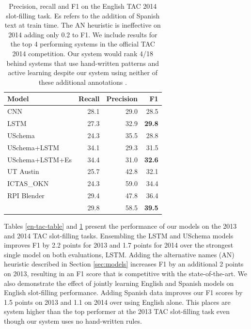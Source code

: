 \begin{table}[t!]
\begin{center}
\begin{tabular}{|lrrr|}
\hline
\bf Model & \bf Recall & \bf Precision & \bf F1 \\
\hline\hline
CNN                 & 28.1 & 29.0 & 28.5 \\
LSTM                & 27.3 & 32.9 & \bf 29.8  \\
USchema             & 24.3 & 35.5 & 28.8 \\
\hline\hline
USchema+LSTM        & 34.1 & 29.3 & 31.5 \\
USchema+LSTM+Es        & 34.4 & 31.0 & \bf 32.6 \\
\hline\hline
UT Austin & 25.7 & 42.8 & 32.1 \\
ICTAS\_OKN & 24.3 & 59.0 & 34.4 \\
RPI Blender & 29.4 & 47.8 & 36.4 \\
\citet{angeli2014stanford} & 29.8 & 58.5 & \bf 39.5 \\

\hline
\end{tabular}
\caption{Precision, recall and F1 on the English TAC 2014 slot-filling task. Es refers to the addition of Spanish text at train time. The AN heuristic is ineffective on 2014 adding only 0.2 to F1. We include results for the top 4 performing systems in the official TAC 2014 competition. Our system would rank 4/18 behind systems that use hand-written patterns and active learning despite our system using neither of these additional annotations \protect\citep{SurdeanuMihai2014}.\label{2014-en-tac-table}}
\end{center}
\end{table}

Tables \ref{en-tac-table} and \ref{2014-en-tac-table} present the performance of our models on the 2013 and 2014 TAC slot-filling tasks. Ensembling the LSTM and USchema models improves F1 by 2.2 points for 2013 and 1.7 points for 2014 over the strongest single model on both evaluations, LSTM. Adding the alternative names (AN) heuristic described in Section \ref{sec:models} increases F1 by an additional 2 points on 2013, resulting in an F1 score that is competitive with the state-of-the-art. We also demonstrate the effect of jointly learning English and Spanish models on English slot-filling performance. Adding Spanish data improves our F1 scores by 1.5 points on 2013 and 1.1 on 2014 over using English alone. This places are system higher than the top performer at the 2013 TAC slot-filling task even though our system uses no hand-written rules.

